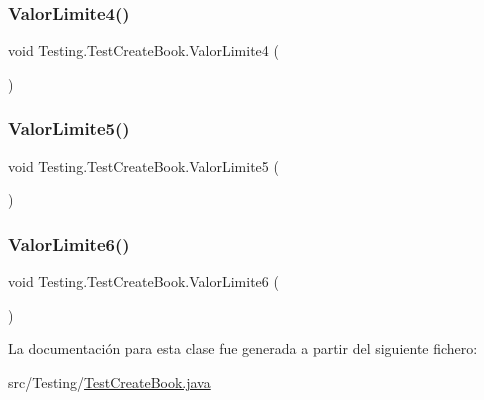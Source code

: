 \mbox{\label{class_testing_1_1_test_create_book_aa03012fcb19cb39318030c62e0d5c2c0}} 
\subsubsection{\texorpdfstring{ValorLimite4()}{ValorLimite4()}}
{\footnotesize\ttfamily void Testing.\+Test\+Create\+Book.\+Valor\+Limite4 (\begin{DoxyParamCaption}{ }\end{DoxyParamCaption})}

\mbox{\label{class_testing_1_1_test_create_book_a2035e4dc156b0c064f828a621a5d8232}} 
\subsubsection{\texorpdfstring{ValorLimite5()}{ValorLimite5()}}
{\footnotesize\ttfamily void Testing.\+Test\+Create\+Book.\+Valor\+Limite5 (\begin{DoxyParamCaption}{ }\end{DoxyParamCaption})}

\mbox{\label{class_testing_1_1_test_create_book_acadc2ebf7b47c3d62a7164d7e1f009ad}} 
\subsubsection{\texorpdfstring{ValorLimite6()}{ValorLimite6()}}
{\footnotesize\ttfamily void Testing.\+Test\+Create\+Book.\+Valor\+Limite6 (\begin{DoxyParamCaption}{ }\end{DoxyParamCaption})}



La documentación para esta clase fue generada a partir del siguiente fichero\+:\begin{DoxyCompactItemize}
\item 
src/\+Testing/\mbox{\hyperlink{_test_create_book_8java}{Test\+Create\+Book.\+java}}\end{DoxyCompactItemize}
